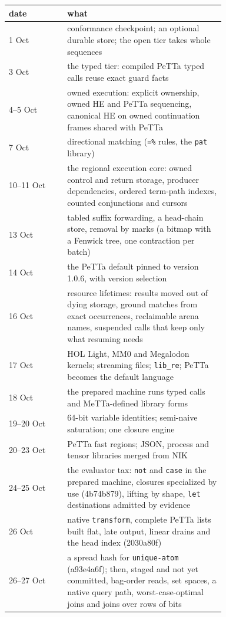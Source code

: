 \documentclass[11pt]{article}
\newcommand{\code}[1]{\texttt{#1}}
\newcommand{\PeTTa}{\textup{PeTTa}}
\newcommand{\HE}{\textup{HE}}
\begin{document}
\begin{center}
\small
\begin{tabular}{@{}lp{0.73\linewidth}@{}}
\toprule
date & what \\
\midrule
1 Oct & conformance checkpoint; an optional durable store; the open tier takes whole sequences \\
3 Oct & the typed tier: compiled \PeTTa{} typed calls reuse exact guard facts \\
4--5 Oct & owned execution: explicit ownership, owned \HE{} and \PeTTa{} sequencing, canonical \HE{} on owned continuation frames shared with \PeTTa{} \\
7 Oct & directional matching (\code{=\%} rules, the \code{pat} library) \\
10--11 Oct & the regional execution core: owned control and return storage, producer dependencies, ordered term-path indexes, counted conjunctions and cursors \\
13 Oct & tabled suffix forwarding, a head-chain store, removal by marks (a bitmap with a Fenwick tree, one contraction per batch) \\
14 Oct & the \PeTTa{} default pinned to version 1.0.6, with version selection \\
16 Oct & resource lifetimes: results moved out of dying storage, ground matches from exact occurrences, reclaimable arena names, suspended calls that keep only what resuming needs \\
17 Oct & HOL Light, MM0 and Megalodon kernels; streaming files; \code{lib\_re}; \PeTTa{} becomes the default language \\
18 Oct & the prepared machine runs typed calls and MeTTa-defined library forms \\
19--20 Oct & 64-bit variable identities; semi-naive saturation; one closure engine \\
20--23 Oct & \PeTTa{} fast regions; JSON, process and tensor libraries merged from NIK \\
24--25 Oct & the evaluator tax: \code{not} and \code{case} in the prepared machine, closures specialized by use (4b74b879), lifting by shape, \code{let} destinations admitted by evidence \\
26 Oct & native \code{transform}, complete \PeTTa{} lists built flat, late output, linear drains and the head index (2030a80f) \\
26--27 Oct & a spread hash for \code{unique-atom} (a93e4a6f); then, staged and not yet committed, bag-order reads, set spaces, a native query path, worst-case-optimal joins and joins over rows of bits \\
\bottomrule
\end{tabular}
\end{center}
\end{document}

